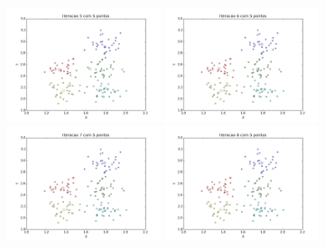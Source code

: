 \documentclass[12pt, a4paper]{article}
\begin{document}
\begin{landscape}
\begin{figure}[!ht]
    \includegraphics[width=0.4\textwidth]{depois_5.png} 
    \includegraphics[width=0.4\textwidth]{depois_6.png}    
    \includegraphics[width=0.4\textwidth]{depois_7.png}
    \includegraphics[width=0.4\textwidth]{depois_8.png}
\end{figure}
\end{landscape}

\newpage

\end{document}
